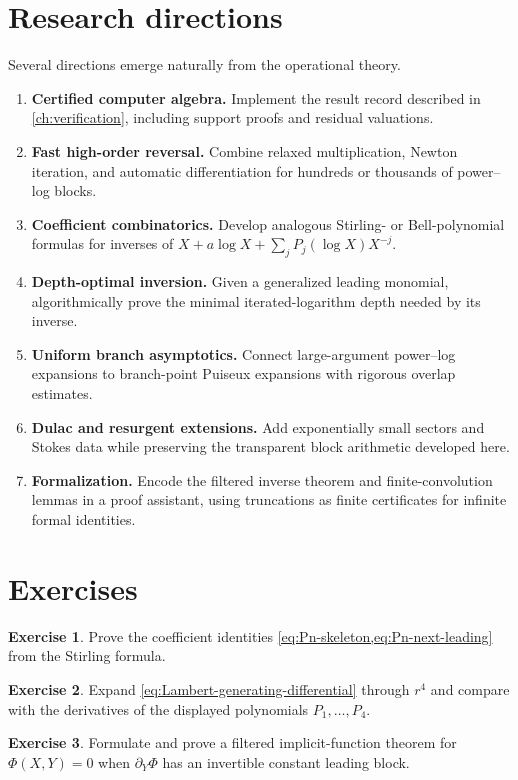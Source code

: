 \documentclass[11pt,openany]{book}
\theoremstyle{definition}
\newtheorem{exercise}{Exercise}[chapter]
\theoremstyle{plain}
\theoremstyle{remark}
\begin{document}
\section{Research directions}
Several directions emerge naturally from the operational theory.
\begin{enumerate}
\item \textbf{Certified computer algebra.} Implement the result record described in \cref{ch:verification}, including support proofs and residual valuations.
\item \textbf{Fast high-order reversal.} Combine relaxed multiplication, Newton iteration, and automatic differentiation for hundreds or thousands of power--log blocks.
\item \textbf{Coefficient combinatorics.} Develop analogous Stirling- or Bell-polynomial formulas for inverses of \(X+a\log X+\sum_jP_j(\log X)X^{-j}\).
\item \textbf{Depth-optimal inversion.} Given a generalized leading monomial, algorithmically prove the minimal iterated-logarithm depth needed by its inverse.
\item \textbf{Uniform branch asymptotics.} Connect large-argument power--log expansions to branch-point Puiseux expansions with rigorous overlap estimates.
\item \textbf{Dulac and resurgent extensions.} Add exponentially small sectors and Stokes data while preserving the transparent block arithmetic developed here.
\item \textbf{Formalization.} Encode the filtered inverse theorem and finite-convolution lemmas in a proof assistant, using truncations as finite certificates for infinite formal identities.
\end{enumerate}

\section{Exercises}
\begin{exercise}
Prove the coefficient identities \cref{eq:Pn-skeleton,eq:Pn-next-leading} from the Stirling formula.
\end{exercise}
\begin{exercise}
Expand \cref{eq:Lambert-generating-differential} through \(r^4\) and compare with the derivatives of the displayed polynomials \(P_1,\ldots,P_4\).
\end{exercise}
\begin{exercise}
Formulate and prove a filtered implicit-function theorem for \(\Phi(X,Y)=0\) when \(\partial_Y\Phi\) has an invertible constant leading block.
\end{exercise}
\end{document}
